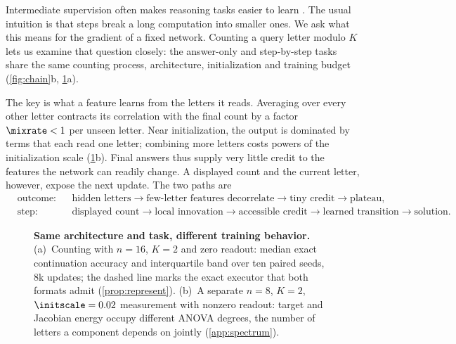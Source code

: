 Intermediate supervision often makes reasoning tasks easier to learn \citep{nye2021scratchpads,wei2022cot,lightman2023verify}.
The usual intuition is that steps break a long computation into smaller ones. We ask what this means for the gradient of a fixed
network. Counting a query letter modulo $K$ lets us examine that question closely: the answer-only and step-by-step tasks share the
same counting process, architecture, initialization and training budget (\cref{fig:chain}b, \cref{fig:overview}a).

The key is what a feature learns from the letters it reads. Averaging over every other letter contracts its correlation with the
final count by a factor $\mixrate<1$ per unseen letter. Near initialization, the output is dominated by terms that each read one letter;
combining more letters costs powers of the initialization scale (\cref{fig:overview}b). Final answers thus supply very little credit
to the features the network can readily change. A displayed count and the current letter, however, expose the next update. The two paths are
{\small
\[
\begin{aligned}
 &\text{outcome:}&&\text{hidden letters}\to\text{few-letter features decorrelate}\to\text{tiny credit}\to\text{plateau},\\
 &\text{step:}&&\text{displayed count}\to\text{local innovation}\to\text{accessible credit}\to\text{learned transition}\to\text{solution}.
\end{aligned}
\]
}

\begin{figure}[t]
\centering

\caption{\textbf{Same architecture and task, different training behavior.}
(a)~Counting with $n=16$, $K=2$ and zero readout: median exact continuation accuracy and interquartile band over ten paired seeds, $8$k
updates; the dashed line marks the exact executor that both formats admit (\cref{prop:represent}).
(b)~A separate $n=8$, $K=2$, $\initscale=0.02$ measurement with nonzero readout: target and Jacobian energy occupy different ANOVA degrees, the number of letters a component depends on jointly (\cref{app:spectrum}).}
\label{fig:overview}
\end{figure}

